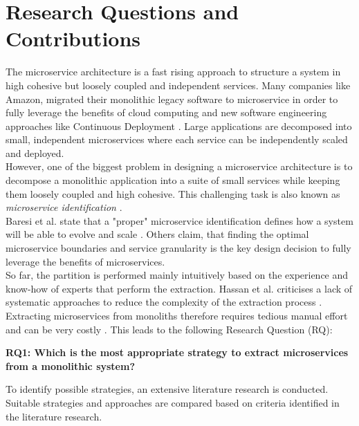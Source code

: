\section{Research Questions and Contributions}
\label{sec:Introduction:ResearchQuestions}
The microservice architecture is a fast rising approach to structure a system in high cohesive but loosely coupled and independent services. Many companies like Amazon, migrated their monolithic legacy software to microservice in order to fully leverage the benefits of cloud computing and new software engineering approaches like Continuous Deployment \cite{MigratingCloud}. Large applications are decomposed into small, independent microservices where each service can be independently scaled and deployed. 
\\
However, one of the biggest problem in designing a microservice architecture is to decompose a monolithic application into a suite of small services while keeping them loosely coupled and high cohesive. This challenging task is also known as \textit{microservice identification} \cite{ObjectAwareAmiri}. \\
Baresi et al. state that a "proper" microservice identification defines how a system will be able to evolve and scale \cite{interfaceAnalysisBaresi}. Others claim, that finding the optimal microservice boundaries \cite{ClassificationOfRefactoring} and service granularity  \cite{ArchitecturalMetaModelling} is the key design decision to fully leverage the benefits of microservices. 
\\
So far, the partition is performed mainly intuitively based on the experience and know-how of experts that perform the extraction. Hassan et al. criticises a lack of systematic approaches to reduce the complexity of the extraction process \cite{ArchitecturalMetaModelling}. Extracting microservices from monoliths therefore requires tedious manual effort and can be very costly \cite{FunctionalDecompositionHeinrich} \cite{ExtractionMazlami}. This leads to the following Research Question (RQ):

\vspace{1cm}
\par
\begingroup
\leftskip=1cm
\rightskip=1cm


\noindent
\textbf{RQ1: Which is the most appropriate strategy to extract microservices from a monolithic  
	system?}

\vspace{0.5cm}
\noindent
To identify possible strategies, an extensive literature research is conducted. Suitable strategies and approaches are compared based on criteria identified in the literature research.
\vspace{0.5cm}

